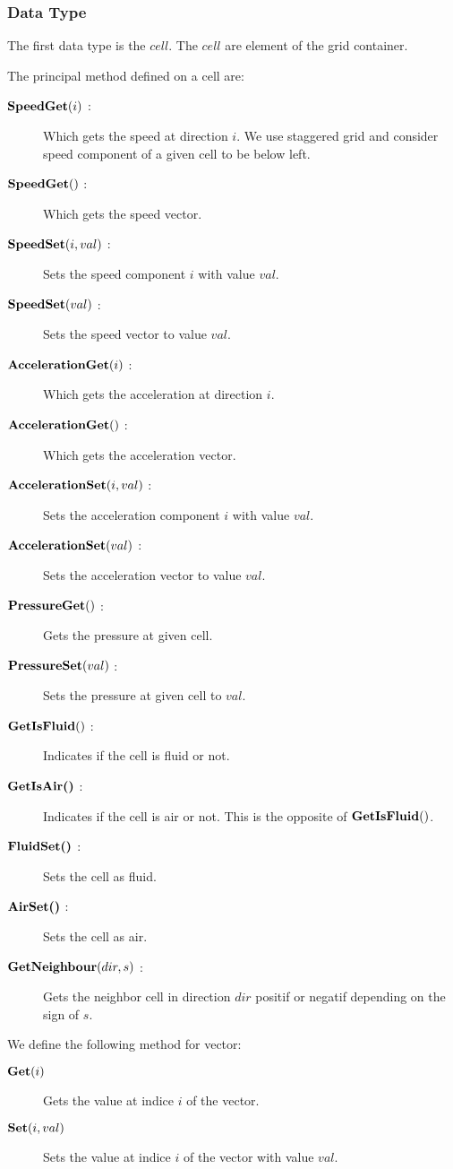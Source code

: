 \subsubsection{Data Type}

The first data type is the $cell$. The $cell$ are element of the grid container.

The principal method defined on a cell are:
\begin{description}
 \item[$\mathop{\textbf{SpeedGet}}(i)$ :] Which gets the speed at direction $i$. We use staggered grid and consider speed component of a given cell
 to be below left.
  \item[$\mathop{\textbf{SpeedGet}}()$ :] Which gets the speed vector.
 \item[$\mathop{\textbf{SpeedSet}}(i,val)$ :] Sets the speed component $i$ with value $val$.
 \item[$\mathop{\textbf{SpeedSet}}(val)$ :] Sets the speed vector to value $val$.
 \item[$\mathop{\textbf{AccelerationGet}}(i)$ :] Which gets the acceleration at direction $i$.
 \item[$\mathop{\textbf{AccelerationGet}}()$ :] Which gets the acceleration vector.
 \item[$\mathop{\textbf{AccelerationSet}}(i,val)$ :] Sets the acceleration component $i$ with value $val$.
 \item[$\mathop{\textbf{AccelerationSet}}(val)$ :] Sets the acceleration vector to value $val$.
 \item[$\mathop{\textbf{PressureGet}}()$ :] Gets the pressure at given cell.
 \item[$\mathop{\textbf{PressureSet}}(val)$ :] Sets the pressure at given cell to $val$.
 \item[$\mathop{\textbf{GetIsFluid}}()$ :] Indicates if the cell is fluid or not.
 \item[$\mathop{\textbf{GetIsAir()}}$ :] Indicates if the cell is air or not. This is the opposite of $\mathop{\textbf{GetIsFluid}}()$.
 \item[$\mathop{\textbf{FluidSet()}}$ :] Sets the cell as fluid.
 \item[$\mathop{\textbf{AirSet()}}$ :] Sets the cell as air.
 \item[$\mathop{\textbf{GetNeighbour}}(dir,s)$ :] Gets the neighbor cell in direction $dir$ positif or negatif depending on the sign of $s$.
\end{description}

We define the following method for vector:
\begin{description}
 \item[$\mathop{\textbf{Get}}(i)$] Gets the value at indice $i$ of the vector.
  \item[$\mathop{\textbf{Set}}(i,val)$] Sets the value at indice $i$ of the vector with value $val$.
\end{description}

